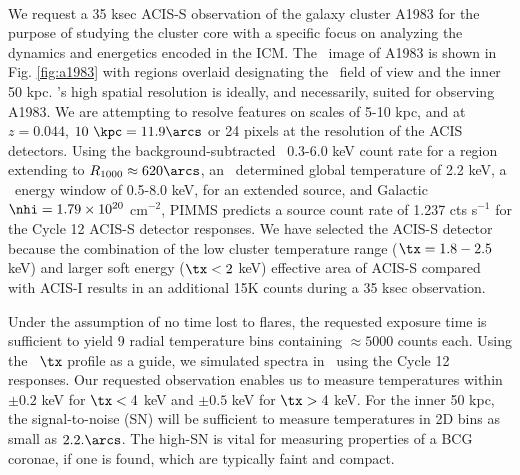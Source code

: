 \documentclass[letterpaper,11pt,twocolumn]{article}
\begin{document}
\\
We request a 35 ksec ACIS-S observation of the galaxy cluster A1983
for the purpose of studying the cluster core with a specific focus on
analyzing the dynamics and energetics encoded in the ICM. The
\xmm\ image of A1983 is shown in Fig. \ref{fig:a1983} with regions
overlaid designating the \chandra\ field of view and the inner 50
kpc. \chandra's high spatial resolution is ideally, and necessarily,
suited for observing A1983. We are attempting to resolve features on
scales of 5-10 kpc, and at $z = 0.044$, $10 ~\kpc = 11.9\arcs$ or 24
pixels at the resolution of the ACIS detectors. Using the
background-subtracted \xmm\ 0.3-6.0 keV count rate for a region
extending to $R_{1000} \approx 620\arcs$, an \xmm\ determined global
temperature of 2.2 keV, a \chandra\ energy window of 0.5-8.0 keV, for
an extended source, and Galactic $\nhi = 1.79\times10^{20}$ cm$^{-2}$,
PIMMS predicts a source count rate of 1.237 cts s$^{-1}$ for the Cycle
12 ACIS-S detector responses. We have selected the ACIS-S detector
because the combination of the low cluster temperature range ($\tx =
1.8-2.5$ keV) and larger soft energy ($\tx < 2$ keV) effective area of
ACIS-S compared with ACIS-I results in an additional 15K counts during
a 35 ksec observation.

Under the assumption of no time lost to flares, the requested exposure
time is sufficient to yield 9 radial temperature bins containing
$\approx 5000$ counts each. Using the \xmm\ $\tx$ profile as a guide,
we simulated spectra in \xspec\ using the Cycle 12 responses. Our
requested observation enables us to measure temperatures within $\pm
0.2$ keV for $\tx < 4$ keV and $\pm 0.5$ keV for $\tx > 4$ keV. For
the inner 50 kpc, the signal-to-noise (SN) will be sufficient to
measure temperatures in 2D bins as small as $2.2.\arcs$. The high-SN
is vital for measuring properties of a BCG coronae, if one is found,
which are typically faint and compact.
\end{document}
